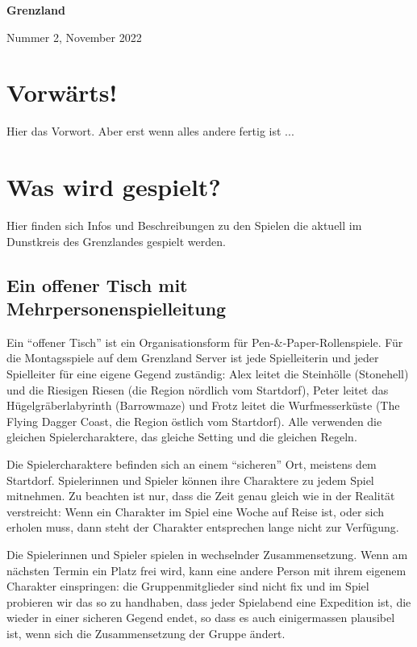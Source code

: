 \documentclass[11pt]{wbzine}
\begin{document}


{\bfseries\fontsize{70}{55}
 \selectfont Grenzland \par}%
 \hrulefill
 Nummer 2, November 2022

\tableofcontents

\begin{multicols}{2}

\section{Vorwärts!}

Hier das Vorwort. Aber erst wenn alles andere fertig ist ...

\section{Was wird gespielt?}

Hier finden sich Infos und Beschreibungen zu den Spielen die aktuell
im Dunstkreis des Grenzlandes gespielt werden.

    \subsection{Ein offener Tisch mit Mehrpersonenspielleitung}

Ein “offener Tisch” ist ein Organisationsform für Pen-\&-Paper-Rollenspiele.
	Für die Montagsspiele auf dem Grenzland Server ist jede Spielleiterin
	und jeder Spielleiter für eine eigene Gegend zuständig: Alex leitet die
	Steinhölle (Stonehell) und die Riesigen Riesen (die Region nördlich vom
	Startdorf), Peter leitet das Hügelgräberlabyrinth (Barrowmaze) und
	Frotz leitet die Wurfmesserküste (The Flying Dagger Coast, die Region
	östlich vom Startdorf). Alle verwenden die gleichen Spielercharaktere,
	das gleiche Setting und die gleichen Regeln.

Die Spielercharaktere befinden sich an einem “sicheren” Ort, meistens dem
	Startdorf. Spielerinnen und Spieler können ihre Charaktere zu jedem
	Spiel mitnehmen. Zu beachten ist nur, dass die Zeit genau gleich wie in
	der Realität verstreicht: Wenn ein Charakter im Spiel eine Woche auf
	Reise ist, oder sich erholen muss, dann steht der Charakter entsprechen
	lange nicht zur Verfügung.

Die Spielerinnen und Spieler spielen in wechselnder Zusammensetzung. Wenn am
	nächsten Termin ein Platz frei wird, kann eine andere Person mit ihrem
	eigenem Charakter einspringen: die Gruppenmitglieder sind nicht fix und
	im Spiel probieren wir das so zu handhaben, dass jeder Spielabend eine
	Expedition ist, die wieder in einer sicheren Gegend endet, so dass es
	auch einigermassen plausibel ist, wenn sich die Zusammensetzung der
	Gruppe ändert.


\end{multicols}
\end{document}
